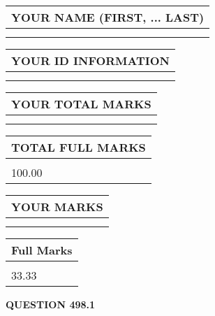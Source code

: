 \documentclass{ctexart}
\begin{document}
   
   
   
\newpage 
\setcounter{page}{ 
   498001 } 
   
   
   
   
\noindent\begin{tabular}{|l|}
\hline
YOUR NAME (FIRST, ... LAST)  \\
\hline
 \\ 
 \\ 
\hline
\end{tabular}
\hspace{0.05in} \begin{tabular}{|l|}
\hline
 YOUR   ID   INFORMATION  \\
\hline
 \\ 
 \\ 
\hline
\end{tabular}
   
   
\vspace{0.2in}\noindent\begin{tabular}{|l|}
\hline
YOUR TOTAL MARKS  \\
\hline
 \\ 
 \\ 
\hline
\end{tabular}
\hspace{0.05in} \begin{tabular}{|l|}
\hline
TOTAL FULL MARKS  \\
\hline
 \\ 
100.00 \\
\hline
\end{tabular}
   
   
 \vspace{0.2in}
 
 
 
 
   
   
  
\vspace{0.2in}
  
\noindent\begin{tabular}{|l|}
\hline
 YOUR MARKS  \\
\hline
 \\ 
 \\ 
\hline
\end{tabular}
\hspace{0.05in} \begin{tabular}{|l|}
\hline
 Full Marks  \\
\hline
 \\ 
33.33 \\
\hline
\end{tabular}
{\textbf{\Large{QUESTION
498.1 
}}}
  
\end{document}
